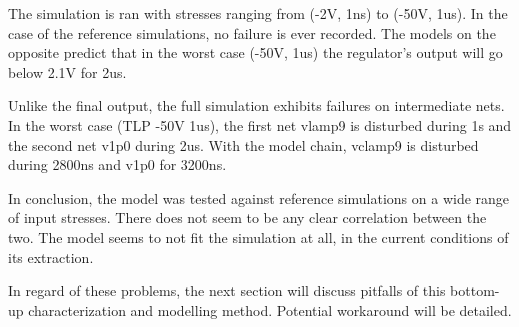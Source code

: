 The simulation is ran with stresses ranging from (-2V, 1ns) to (-50V, 1us).
In the case of the reference simulations, no failure is ever recorded.
The models on the opposite predict that in the worst case (-50V, 1us) the regulator's output will go below 2.1V for 2us.

Unlike the final output, the full simulation exhibits failures on intermediate nets.
In the worst case (TLP -50V 1us), the first net vlamp9 is disturbed during 1\textmugreek{}s and the second net v1p0 during 2us.
With the model chain, vclamp9 is disturbed during 2800ns and v1p0 for 3200ns.

In conclusion, the model was tested against reference simulations on a wide range of input stresses.
There does not seem to be any clear correlation between the two.
The model seems to not fit the simulation at all, in the current conditions of its extraction.

In regard of these problems, the next section will discuss pitfalls of this bottom-up characterization and modelling method.
Potential workaround will be detailed.
